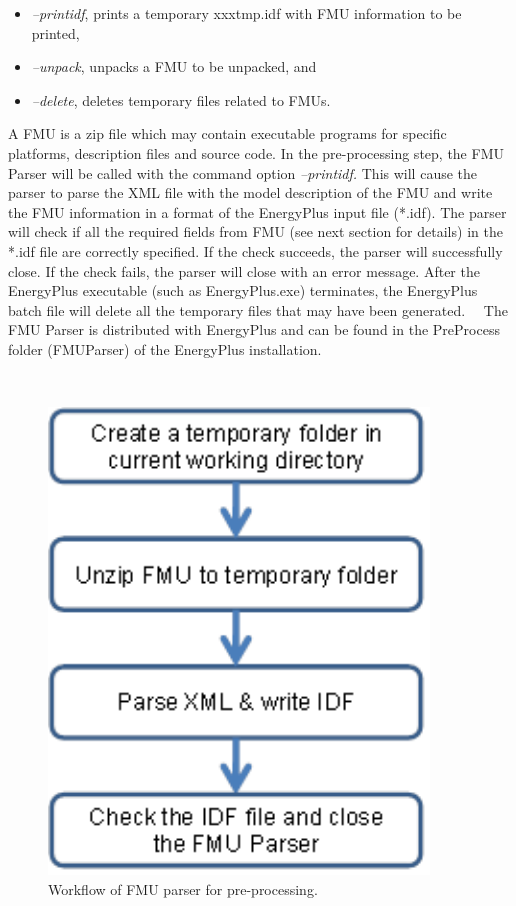 \begin{itemize}
\item
  \emph{--printidf}, prints a temporary xxxtmp.idf with FMU information to be printed,
\item
  \emph{--unpack}, unpacks a FMU to be unpacked, and
\item
  \emph{--delete}, deletes temporary files related to FMUs.
\end{itemize}

A FMU is a zip file which may contain executable programs for specific platforms, description files and source code. In the pre-processing step, the FMU Parser will be called with the command option \emph{--printidf.} This will cause the parser to parse the XML file with the model description of the FMU and write the FMU information in a format of the EnergyPlus input file (*.idf). The parser will check if all the required fields from FMU (see next section for details) in the *.idf file are correctly specified. If the check succeeds, the parser will successfully close. If the check fails, the parser will close with an error message. After the EnergyPlus executable (such as EnergyPlus.exe) terminates, the EnergyPlus batch file will delete all the temporary files that may have been generated.~~ The FMU Parser is distributed with EnergyPlus and can be found in the PreProcess folder (FMUParser) of the EnergyPlus installation.

\textbf{~}

\begin{figure}[hbtp] %
\centering
\includegraphics[width=0.9\textwidth, height=0.9\textheight, keepaspectratio=true]{media/image037.png}
\caption{Workflow of FMU parser for pre-processing. \protect \label{fig:workflow-of-fmu-parser-for-pre-processing.}}
\end{figure}

